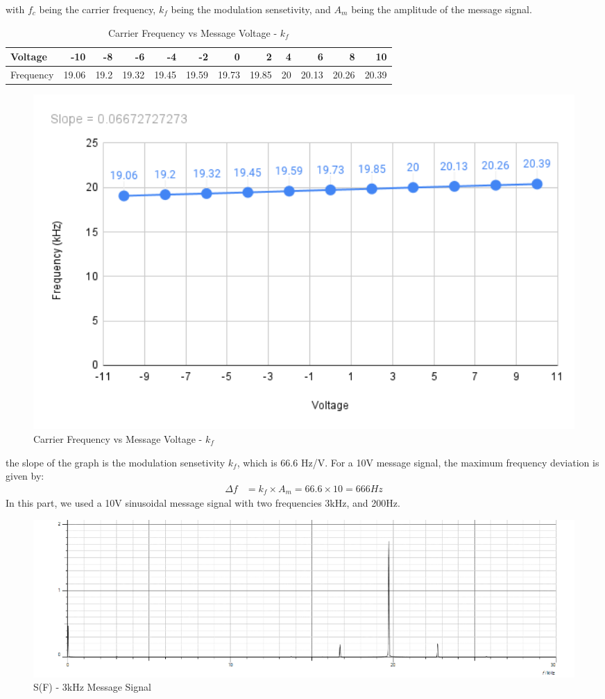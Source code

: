 \documentclass[12pt]{article}
\begin{document}
with $f_c$ being the carrier frequency, $k_f$ being the modulation sensetivity, and $A_m$ being the amplitude of the message signal. 
\begin{table}[H]
    \centering
    \begin{tabular}{l|r|r|r|r|r|r|r|r|r|r|r}
    \hline
    Voltage  & -10   & -8   & -6    & -4    & -2    & 0     & 2     & 4  & 6     & 8     & 10 \\ \hline
    Frequency & 19.06 & 19.2 & 19.32 & 19.45 & 19.59 & 19.73 & 19.85 & 20 & 20.13 & 20.26 & 20.39 \\ \hline
    \end{tabular}
    \caption{Carrier Frequency vs Message Voltage - $k_f$}
\end{table}

\begin{figure}[H]
    \centering
    \includegraphics[width=1\textwidth]{assets/img/chart.png}
    \caption{Carrier Frequency vs Message Voltage - $k_f$}
\end{figure}
the slope of the graph is the modulation sensetivity $k_f$, which is 66.6 Hz/V.
For a 10V message signal, the maximum frequency deviation is given by:
\begin{equation}
    \begin{aligned}
        \Delta f &= k_f \times A_m = 66.6 \times 10 = 666 Hz
    \end{aligned}
\end{equation}
In this part, we used a 10V sinusoidal message signal with two frequencies 3kHz, and 200Hz.
\begin{figure}[H]
    \centering
    \includegraphics[width=1\textwidth]{assets/3k.png}
    \caption{S(F) - 3kHz Message Signal}
\end{figure}
\end{document}
